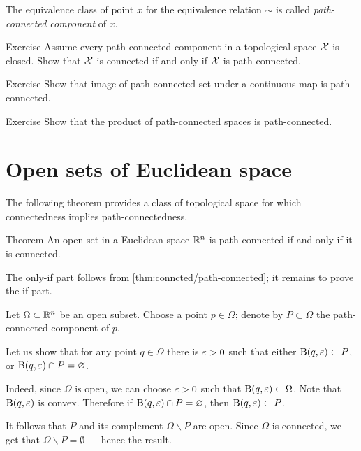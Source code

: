 The equivalence class of point $x$ for the equivalence relation $\sim$ is called \emph{path-connected component} of $x$. 

\begin{thm}{Exercise}
Assume every path-connected component in a topological space $\mathcal{X}$ is closed.
Show that $\mathcal{X}$ is connected if and only if $\mathcal{X}$ is path-connected.
\end{thm}

\begin{thm}{Exercise}
Show that image of path-connected set under a continuous map is path-connected.
\end{thm}

\begin{thm}{Exercise}
Show that the product of path-connected spaces is path-connected.
\end{thm}

\section{Open sets of Euclidean space}

The following theorem provides a class of topological space for which connectedness implies path-connectedness.

\begin{thm}{Theorem}\label{thm:open-connected=path-connected}
An open set in a Euclidean space $\mathbb{R}^n$ is path-connected if and only if it is connected.
\end{thm}

The only-if part follows from \ref{thm:conncted/path-connected};
it remains to prove the if part.

Let $\Omega\subset\mathbb{R}^n$ be an open subset.
Choose a point $p\in\Omega$; denote by $P\subset \Omega$ the path-connected component of $p$.

Let us show that for any point $q\in \Omega$ there is $\varepsilon>0$ such that either $\mathrm{B}(q,\varepsilon)\subset P$, or $\mathrm{B}(q,\varepsilon)\cap P=\varnothing$.

Indeed, since $\Omega$ is open, we can choose $\varepsilon>0$ such that $\Ball(q,\eps)\z\subset\Omega$.
Note that $\mathrm{B}(q,\varepsilon)$ is convex.
Therefore if $\mathrm{B}(q,\varepsilon)\cap P=\varnothing$, then $\mathrm{B}(q,\varepsilon)\subset P$.

It follows that $P$ and its complement $\Omega\backslash P$ are open.
Since $\Omega$ is connected, we get that $\Omega\backslash P=\emptyset$ --- hence the result.
\qeds



